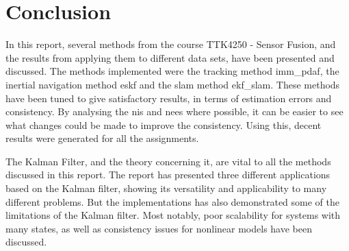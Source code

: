 \section{Conclusion}\label{sec:conclusion}
In this report, several methods from the course TTK4250 - Sensor Fusion, and the results from applying them to different data sets, have been presented and discussed. The methods implemented were the tracking method \acrshort{imm_pdaf}, the inertial navigation method \acrshort{eskf} and the \acrshort{slam} method \acrshort{ekf_slam}. These methods have been tuned to give satisfactory results, in terms of estimation errors and consistency. By analysing the \acrshort{nis} and \acrshort{nees} where possible, it can be easier to see what changes could be made to improve the consistency. Using this, decent results were generated for all the assignments. 

The Kalman Filter, and the theory concerning it, are vital to all the methods discussed in this report. The report has presented three different applications based on the Kalman filter, showing its versatility and applicability to many different problems. But the implementations has also demonstrated some of the limitations of the Kalman filter. Most notably, poor scalability for systems with many states, as well as consistency issues for nonlinear models have been discussed.  





